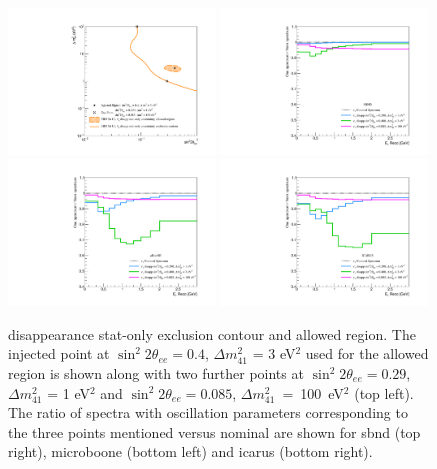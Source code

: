 \begin{figure}[h!]
    \centering
    \includegraphics[width = 0.49\textwidth]{figures-chap6/overlays/nue_disapp_stat_osc_markers.pdf}
    \includegraphics[width = 0.49\textwidth]{figures-chap6/spectra/nue_disapp_spectra_ratio_sbnd.pdf}
    \includegraphics[width = 0.49\textwidth]{figures-chap6/spectra/nue_disapp_spectra_ratio_uboone.pdf}
    \includegraphics[width = 0.49\textwidth]{figures-chap6/spectra/nue_disapp_spectra_ratio_icarus.pdf}
    \caption[Ratio of \nue disappearance spectra with the oscillation parameters shown on the statistical only contour.]{\nue disappearance stat-only exclusion contour and allowed region. The injected point at $\sin^2{2\theta_{ee}} = 0.4$, $\Delta m^2_{41}$ = 3 eV$^2$ used for the allowed region is shown along with two further points at $\sin^2{2\theta_{ee}} = 0.29$, $\Delta m^2_{41}$ = 1 eV$^2$ and \mbox{$\sin^2{2\theta_{ee}} = 0.085$}, \mbox{$\Delta m^2_{41}$ = 100 eV$^2$} (top left). The ratio of spectra with oscillation parameters corresponding to the three points mentioned versus nominal are shown for \gls{sbnd} (top right), \gls{microboone} (bottom left) and \gls{icarus} (bottom right).}
    \label{fig:nue_disapp_spectra_ratios}
\end{figure}



